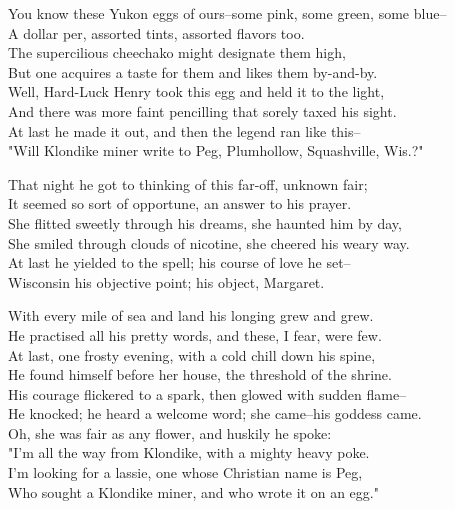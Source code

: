 \begin{poemblock}
You know these Yukon eggs of ours--some pink, some green, some blue--\\
A dollar per, assorted tints, assorted flavors too.\\
The supercilious cheechako might designate them high,\\
But one acquires a taste for them and likes them by-and-by.\\
Well, Hard-Luck Henry took this egg and held it to the light,\\
And there was more faint pencilling that sorely taxed his sight.\\
At last he made it out, and then the legend ran like this--\\
"Will Klondike miner write to Peg, Plumhollow, Squashville, Wis.?"

That night he got to thinking of this far-off, unknown fair;\\
It seemed so sort of opportune, an answer to his prayer.\\
She flitted sweetly through his dreams, she haunted him by day,\\
She smiled through clouds of nicotine, she cheered his weary way.\\
At last he yielded to the spell; his course of love he set--\\
Wisconsin his objective point; his object, Margaret.

With every mile of sea and land his longing grew and grew.\\
He practised all his pretty words, and these, I fear, were few.\\
At last, one frosty evening, with a cold chill down his spine,\\
He found himself before her house, the threshold of the shrine.\\
His courage flickered to a spark, then glowed with sudden flame--\\
He knocked; he heard a welcome word; she came--his goddess came.\\
Oh, she was fair as any flower, and huskily he spoke:\\
"I'm all the way from Klondike, with a mighty heavy poke.\\
I'm looking for a lassie, one whose Christian name is Peg,\\
Who sought a Klondike miner, and who wrote it on an egg."


\end{poemblock}

